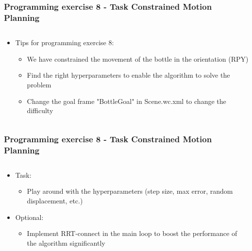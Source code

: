 \documentclass{beamer}
\begin{document}
\begin{frame}
 \frametitle{Programming exercise 8 - Task Constrained Motion Planning}
  \begin{columns}
    \begin{column}{1\textwidth}
      \begin{itemize}
      \item Tips for programming exercise 8:
       \begin{itemize}
       \item We have constrained the movement of the bottle in the orientation (RPY)
       \item Find the right hyperparameters to enable the algorithm to solve the problem
       \item Change the goal frame "BottleGoal" in Scene.wc.xml to change the difficulty
       \end{itemize}
      \end{itemize}
    \end{column}
  \end{columns}
\end{frame}


\begin{frame}
 \frametitle{Programming exercise 8 - Task Constrained Motion Planning}
  \begin{columns}
    \begin{column}{1\textwidth}
      \begin{itemize}
      \item Task:
       \begin{itemize}
       \item Play around with the hyperparameters (step size, max error, random displacement, etc.)
       \end{itemize}
       \item Optional:
       \begin{itemize}
       \item Implement RRT-connect in the main loop to boost the performance of the algorithm significantly
       \end{itemize}       
      \end{itemize}
    \end{column}
  \end{columns}
\end{frame}


\end{document}
